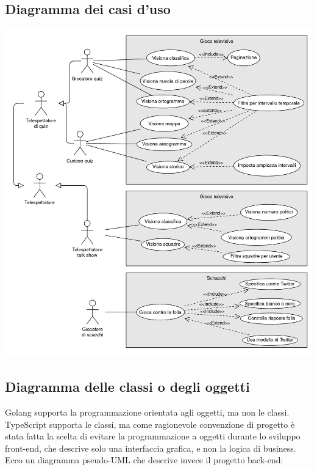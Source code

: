 \documentclass{article}
\begin{document}
\subsection{Diagramma dei casi d'uso}

\includegraphics[width=\textwidth]{use-cases}

\subsection{Diagramma delle classi o degli oggetti}

Golang supporta la programmazione orientata agli oggetti, ma non le classi.
TypeScript supporta le classi, ma come ragionevole convenzione di progetto è
stata fatta la scelta di evitare la programmazione a oggetti durante lo
sviluppo front-end, che descrive solo una interfaccia grafica, e non la logica
di business. Ecco un diagramma pseudo-UML che descrive invece il progetto
back-end:
\end{document}
